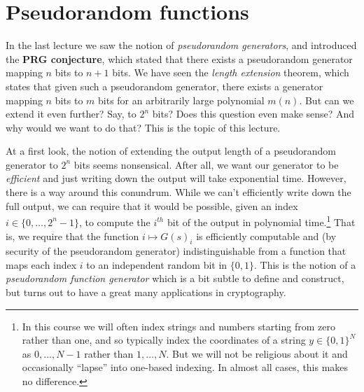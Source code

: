 \chapter{Pseudorandom functions}\label{Pseudorandom-functions}

In the last lecture we saw the notion of \emph{pseudorandom generators},
and introduced the \textbf{PRG conjecture}, which stated that there
exists a pseudorandom generator mapping \(n\) bits to \(n+1\) bits. We
have seen the \emph{length extension} theorem, which states that given
such a pseudorandom generator, there exists a generator mapping \(n\)
bits to \(m\) bits for an arbitrarily large polynomial \(m(n)\). But can
we extend it even further? Say, to \(2^n\) bits? Does this question even
make sense? And why would we want to do that? This is the topic of this
lecture.

At a first look, the notion of extending the output length of a
pseudorandom generator to \(2^n\) bits seems nonsensical. After all, we
want our generator to be \emph{efficient} and just writing down the
output will take exponential time. However, there is a way around this
conundrum. While we can't efficiently write down the full output, we can
require that it would be possible, given an index
\(i\in \{0,\ldots,2^n-1\}\), to compute the \(i^{th}\) bit of the output
in polynomial time.\footnote{In this course we will often index strings
  and numbers starting from zero rather than one, and so typically index
  the coordinates of a string \(y\in \{0,1\}^N\) as \(0,\ldots,N-1\)
  rather than \(1,\ldots,N\). But we will not be religious about it and
  occasionally ``lapse'' into one-based indexing. In almost all cases,
  this makes no difference.} That is, we require that the function
\(i \mapsto G(s)_i\) is efficiently computable and (by security of the
pseudorandom generator) indistinguishable from a function that maps each
index \(i\) to an independent random bit in \(\{0,1\}\). This is the
notion of a \emph{pseudorandom function generator} which is a bit subtle
to define and construct, but turns out to have a great many applications
in cryptography.

\hypertarget{prfdef}{}

